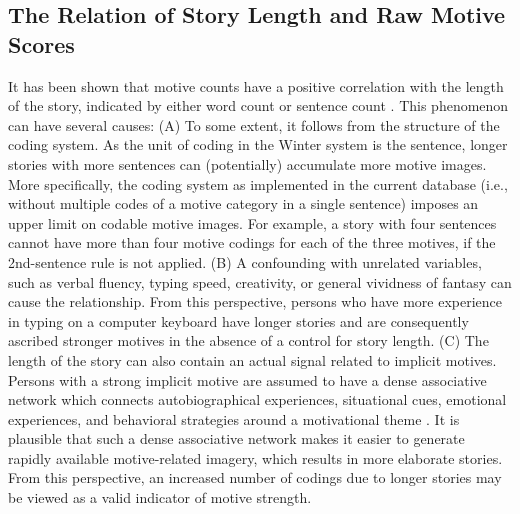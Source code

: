 \documentclass[man,a4paper,mask]{apa6}\usepackage[]{graphicx}\usepackage[]{color}
\begin{document}
\subsection{The Relation of Story Length and Raw Motive Scores}

It has been shown that motive counts have a positive correlation with the length of the story, indicated by either word count or sentence count \parencite{pang_ContentCodingMethods_2010,schultheiss_MeasuringImplicitMotives_2007}. This phenomenon can have several causes: (A) To some extent, it follows from the structure of the coding system. As the unit of coding in the Winter system is the sentence, longer stories with more sentences can (potentially) accumulate more motive images. More specifically, the coding system as implemented in the current database (i.e., without multiple codes of a motive category in a single sentence) imposes an upper limit on codable motive images. For example, a story with four sentences cannot have more than four motive codings for each of the three motives, if the 2nd-sentence rule is not applied.
(B) A confounding with unrelated variables, such as verbal fluency, typing speed, creativity, or general vividness of fantasy can cause the relationship. From this perspective, persons who have more experience in typing on a computer keyboard have longer stories and are consequently ascribed stronger motives in the absence of a control for story length.
(C) The length of the story can also contain an actual signal related to implicit motives. Persons with a strong implicit motive are assumed to have a dense associative network which connects autobiographical experiences, situational cues, emotional experiences, and behavioral strategies around a motivational theme \parencite{schultheiss_reliability_2008,mcclelland_human_1987}. It is plausible that such a dense associative network makes it easier to generate rapidly available motive-related imagery, which results in more elaborate stories. From this perspective, an increased number of codings due to longer stories may be viewed as a valid indicator of motive strength.
\end{document}
